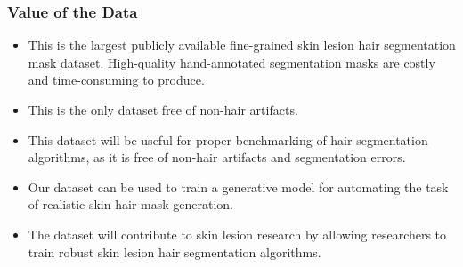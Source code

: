 \subsubsection{Value of the Data}
\begin{itemize}
	
	\item This is the largest publicly available fine-grained skin lesion hair segmentation mask dataset. High-quality hand-annotated segmentation masks are costly and time-consuming to produce.
	
	\item This is the only dataset free of non-hair artifacts.
	
	\item This dataset will be useful for proper benchmarking of hair segmentation algorithms, as it is free of non-hair artifacts and segmentation errors.
	
	\item Our dataset can be used to train a generative model for automating the task of realistic skin hair mask generation.
	
	\item The dataset will contribute to skin lesion research by allowing researchers to train robust skin lesion hair segmentation algorithms.
	
\end{itemize}


